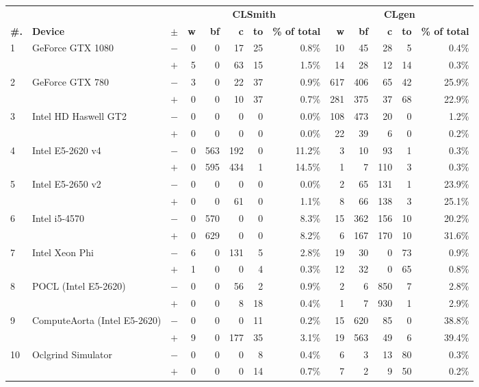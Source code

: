   \begin{tabular}{lll | rrrrr | rrrrr }
  \toprule
  & & & \multicolumn{5}{c|}{\textbf{CLSmith}} & \multicolumn{5}{c}{\textbf{CLgen}} \\
  \textbf{\#.} & \textbf{Device} & $\pm$ &
  \textbf{w} & \textbf{bf} & \textbf{c} & \textbf{to} & \textbf{\% of total} &
  \textbf{w} & \textbf{bf} & \textbf{c} & \textbf{to} & \textbf{\% of total} \\
  \midrule
  \multirow{ 2}{*}{1} & \multirow{ 2}{*}{GeForce GTX 1080} & $-$ & 0 & 0 & 17 & 25 & 0.8\%       & 10 & 45 & 28 & 5 & 0.4\% \\& & $+$ & 5 & 0 & 63 & 15 & 1.5\% & 14 & 28 & 12 & 14 & 0.3\% \\
\hline
\multirow{ 2}{*}{2} & \multirow{ 2}{*}{GeForce GTX 780} & $-$ & 3 & 0 & 22 & 37 & 0.9\%       & 617 & 406 & 65 & 42 & 25.9\% \\& & $+$ & 0 & 0 & 10 & 37 & 0.7\% & 281 & 375 & 37 & 68 & 22.9\% \\
\hline
\multirow{ 2}{*}{3} & \multirow{ 2}{*}{Intel HD Haswell GT2} & $-$ & 0 & 0 & 0 & 0 & 0.0\%       & 108 & 473 & 20 & 0 & 1.2\% \\& & $+$ & 0 & 0 & 0 & 0 & 0.0\% & 22 & 39 & 6 & 0 & 0.2\% \\
\hline
\multirow{ 2}{*}{4} & \multirow{ 2}{*}{Intel E5-2620 v4} & $-$ & 0 & 563 & 192 & 0 & 11.2\%       & 3 & 10 & 93 & 1 & 0.3\% \\& & $+$ & 0 & 595 & 434 & 1 & 14.5\% & 1 & 7 & 110 & 3 & 0.3\% \\
\hline
\multirow{ 2}{*}{5} & \multirow{ 2}{*}{Intel E5-2650 v2} & $-$ & 0 & 0 & 0 & 0 & 0.0\%       & 2 & 65 & 131 & 1 & 23.9\% \\& & $+$ & 0 & 0 & 61 & 0 & 1.1\% & 8 & 66 & 138 & 3 & 25.1\% \\
\hline
\multirow{ 2}{*}{6} & \multirow{ 2}{*}{Intel i5-4570} & $-$ & 0 & 570 & 0 & 0 & 8.3\%       & 15 & 362 & 156 & 10 & 20.2\% \\& & $+$ & 0 & 629 & 0 & 0 & 8.2\% & 6 & 167 & 170 & 10 & 31.6\% \\
\hline
\multirow{ 2}{*}{7} & \multirow{ 2}{*}{Intel Xeon Phi} & $-$ & 6 & 0 & 131 & 5 & 2.8\%       & 19 & 30 & 0 & 73 & 0.9\% \\& & $+$ & 1 & 0 & 0 & 4 & 0.3\% & 12 & 32 & 0 & 65 & 0.8\% \\
\hline
\multirow{ 2}{*}{8} & \multirow{ 2}{*}{POCL (Intel E5-2620)} & $-$ & 0 & 0 & 56 & 2 & 0.9\%       & 2 & 6 & 850 & 7 & 2.8\% \\& & $+$ & 0 & 0 & 8 & 18 & 0.4\% & 1 & 7 & 930 & 1 & 2.9\% \\
\hline
\multirow{ 2}{*}{9} & \multirow{ 2}{*}{ComputeAorta (Intel E5-2620)} & $-$ & 0 & 0 & 0 & 11 & 0.2\%       & 15 & 620 & 85 & 0 & 38.8\% \\& & $+$ & 9 & 0 & 177 & 35 & 3.1\% & 19 & 563 & 49 & 6 & 39.4\% \\
\hline
\multirow{ 2}{*}{10} & \multirow{ 2}{*}{Oclgrind Simulator} & $-$ & 0 & 0 & 0 & 8 & 0.4\%       & 6 & 3 & 13 & 80 & 0.3\% \\& & $+$ & 0 & 0 & 0 & 14 & 0.7\% & 7 & 2 & 9 & 50 & 0.2\% \\
  \bottomrule
\end{tabular}

